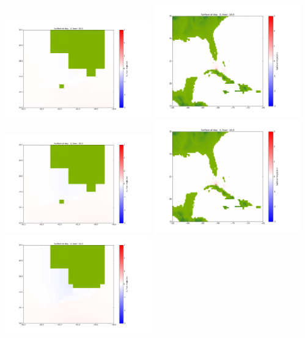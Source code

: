 \documentclass[11pt]{article}
\begin{document}
\vskip 10pt 
\includegraphics[width=0.475\textwidth]{frame0015fig1001.png}
\includegraphics[width=0.475\textwidth]{frame0015fig1002.png}
\vskip 10pt 
\includegraphics[width=0.475\textwidth]{frame0016fig1001.png}
\includegraphics[width=0.475\textwidth]{frame0016fig1002.png}
\vskip 10pt 
\includegraphics[width=0.475\textwidth]{frame0017fig1001.png}
\end{document}
